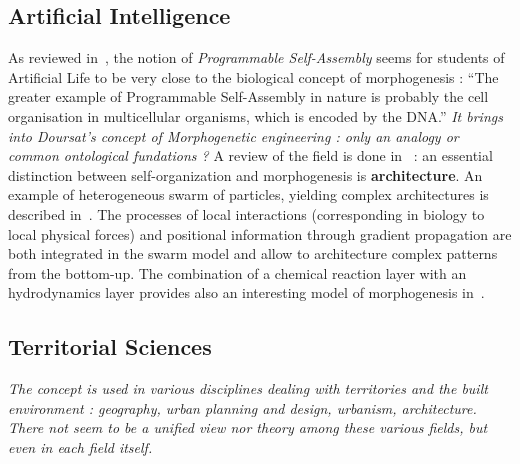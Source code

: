 \documentclass{article}
\begin{document}
\cite{han2016coordinating}




\subsection{Artificial Intelligence}


As reviewed in~\cite{crosato2014self}, the notion of \emph{Programmable Self-Assembly} seems for students of Artificial Life to be very close to the biological concept of morphogenesis : ``The greater example of Programmable Self-Assembly in nature is probably the cell organisation in multicellular organisms, which is encoded by the DNA.'' \textit{It brings into Doursat's concept of Morphogenetic engineering : only an analogy or common ontological fundations ?} A review of the field is done in~\cite{doursat2013review} : an essential distinction between self-organization and morphogenesis is \textbf{architecture}. An example of heterogeneous swarm of particles, yielding complex architectures is described in~\cite{doursat2008programmable}. The processes of local interactions (corresponding in biology to local physical forces) and positional information through gradient propagation are both integrated in the swarm model and allow to architecture complex patterns from the bottom-up. The combination of a chemical reaction layer with an hydrodynamics layer provides also an interesting model of morphogenesis in~\cite{cussat2012synthesis}.




\subsection{Territorial Sciences}

\textit{The concept is used in various disciplines dealing with territories and the built environment : geography, urban planning and design, urbanism, architecture. There not seem to be a unified view nor theory among these various fields, but even in each field itself.}
\end{document}
